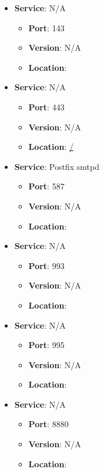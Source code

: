 \documentclass{article}
\begin{document}
\begin{itemize}
        \item \textbf{Service}: N/A
        \begin{itemize}
            \item \textbf{Port}: 143
            \item \textbf{Version}:  N/A 
            \item \textbf{Location}: \href{  }{  }
        \end{itemize}
    
        \item \textbf{Service}: N/A
        \begin{itemize}
            \item \textbf{Port}: 443
            \item \textbf{Version}:  N/A 
            \item \textbf{Location}: \href{ / }{ / }
        \end{itemize}
    
        \item \textbf{Service}: Postfix smtpd
        \begin{itemize}
            \item \textbf{Port}: 587
            \item \textbf{Version}:  N/A 
            \item \textbf{Location}: \href{  }{  }
        \end{itemize}
    
        \item \textbf{Service}: N/A
        \begin{itemize}
            \item \textbf{Port}: 993
            \item \textbf{Version}:  N/A 
            \item \textbf{Location}: \href{  }{  }
        \end{itemize}
    
        \item \textbf{Service}: N/A
        \begin{itemize}
            \item \textbf{Port}: 995
            \item \textbf{Version}:  N/A 
            \item \textbf{Location}: \href{  }{  }
        \end{itemize}
    
        \item \textbf{Service}: N/A
        \begin{itemize}
            \item \textbf{Port}: 8880
            \item \textbf{Version}:  N/A 
            \item \textbf{Location}: \href{  }{  }
        \end{itemize}
    
\end{itemize}
\end{document}
